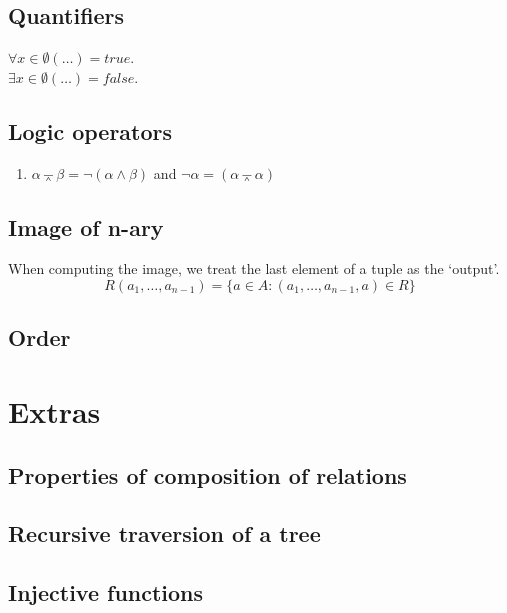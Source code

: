 \documentclass[twocolumn,a4paper]{article}
\newcommand{\image}[2][1.0]{
\begin{figure}[ht]
	\centering
	\fbox{\resizebox{#1\columnwidth}{!}{\texttt{[image: \#2]}}}
\end{figure}
}
\begin{document}
\subsection*{Quantifiers}

\(\forall x\in\emptyset(\ldots) = true\). \\
\(\exists x\in\emptyset(\ldots) = false\).

\subsection*{Logic operators}
\begin{enumerate}
	\item $\alpha \barwedge \beta = \neg (\alpha \wedge \beta)$ and $\neg \alpha = (\alpha \barwedge \alpha)$
\end{enumerate}

\subsection*{Image of n-ary}
When computing the image, we treat the last element of a tuple as the `output'.
\begin{equation}
	R(a_1, \ldots, a_{n-1}) = \{a \in A : (a_1, \ldots, a_{n-1}, a) \in R \}
\end{equation}

\newpage
\subsection*{Order}
\image{misc/order-piazza.png}

\newpage
\section*{Extras}

\subsection*{Properties of composition of relations}
\image{2017_1/2017a/uppg3.png}

\newpage
\subsection*{Recursive traversion of a tree}
\image[0.95]{2017_1/2017a/uppg5.png}

\newpage
\subsection*{Injective functions}
\image{2017_1/2017a/uppg4.png}
\end{document}
